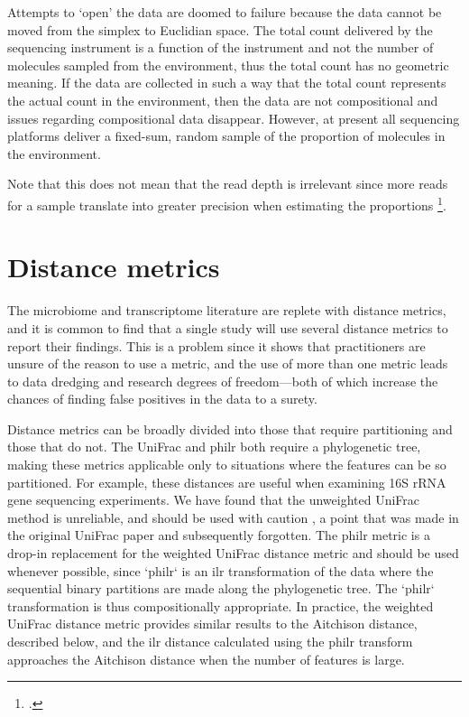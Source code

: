 Attempts to `open' the data are doomed to failure because the data cannot be moved from the simplex to Euclidian space. The total count delivered by the sequencing instrument is a function of the instrument and not the number of molecules sampled from the environment, thus the total count has no geometric meaning. If the data are collected in such a way that the total count represents the actual count in the environment, then the data are not compositional and issues regarding compositional data disappear. However, at present all sequencing platforms deliver a fixed-sum, random sample of the proportion of molecules in the environment.

Note that this does not mean that the read depth is irrelevant since more reads for a sample translate into greater precision when estimating the proportions \footcite{fernandes:2013}.

\section{Distance metrics}

The microbiome and transcriptome literature are replete with distance metrics, and it is common to find that a single study will use several distance metrics to report their findings. This is a problem since it shows that practitioners are unsure of the reason to use a metric, and the use of more than one metric leads to data dredging and research degrees of freedom---both of which increase the chances of finding false positives in the data to a surety.

Distance metrics can be broadly divided into those that require partitioning and those that do not. The UniFrac \cite{Lozupone:2011aa,unifrac:2005} and philr \cite{Silverman:2017aa} both require a phylogenetic tree, making these metrics applicable only to situations where the features can be so partitioned. For example, these distances are useful when examining 16S rRNA gene sequencing experiments. We have found that the unweighted UniFrac method is unreliable, and should be used with caution \cite{Wong:2016aa}, a point that was made in the original UniFrac paper and subsequently forgotten. The philr metric is a drop-in replacement for the weighted UniFrac distance metric and should be used whenever possible, since `philr` is an ilr transformation of the data where the sequential binary partitions are made along the phylogenetic tree. The `philr` transformation is thus compositionally appropriate. In practice, the weighted UniFrac distance metric provides similar results to the Aitchison distance, described below, and the ilr distance calculated using the philr transform approaches the Aitchison distance when the number of features is large. 

